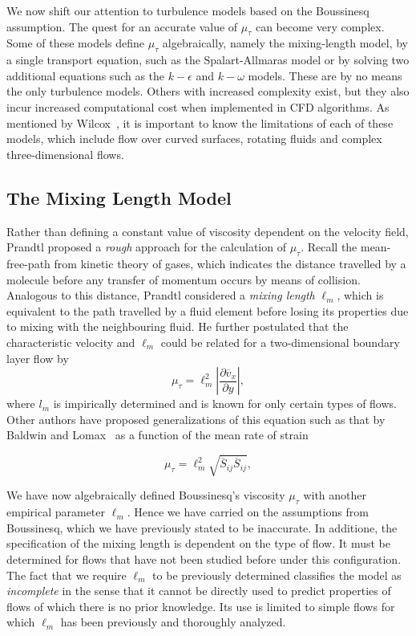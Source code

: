 We now shift our attention to turbulence models based on the Boussinesq assumption. The quest for an accurate value of $\mu_\tau$ can become very complex. Some of these models define $\mu_\tau$ algebraically, namely the mixing-length model, by a single transport equation, such as the Spalart-Allmaras model or by solving two additional equations such as the $k-\epsilon$ and $k-\omega$ models. These are by no means the only turbulence models. Others with increased complexity exist, but they also incur increased computational cost when implemented in CFD algorithms. As mentioned by Wilcox~\cite{wilcox1998turbulence}, it is important to know the limitations of each of these models, which include flow over curved surfaces, rotating fluids and complex three-dimensional flows. 

\subsection{The Mixing Length Model}
Rather than defining a constant value of viscosity dependent on the velocity field, Prandtl proposed a \textit{rough} approach for the calculation of $\mu_\tau$. Recall the mean-free-path from kinetic theory of gases, which indicates the distance travelled by a molecule before any transfer of momentum occurs by means of collision. Analogous to this distance, Prandtl considered a \textit{mixing length} $\ell_m$, which is equivalent to the path travelled by a fluid element before losing its properties due to mixing with the neighbouring fluid. He further postulated that the characteristic velocity and $\ell_m$ could be related for a two-dimensional boundary layer flow by
\begin{equation}
    \mu_\tau = \ell_m^2 \left| \frac{\partial \overline v_x}{\partial y}\right|,
\end{equation}
where $l_m$ is impirically determined and is known for only certain types of flows. Other authors have proposed generalizations of this equation such as that by Baldwin and Lomax~\cite{} as a function of the mean rate of strain~\cite{pope2001turbulent}
\begin{eqBox}
\begin{equation}
    \mu_\tau = \ell_m^2 \sqrt{\overline S_{ij} \overline S_{ij}},
\end{equation}
\end{eqBox}
We have now algebraically defined Boussinesq's viscosity $\mu_\tau$ with another empirical parameter $\ell_m$. Hence we have carried on the assumptions from Boussinesq, which we have previously stated to be inaccurate. In additione, the specification of the mixing length is dependent on the type of flow. It must be determined for flows that have not been studied before under this configuration. The fact that we require $\ell_m$ to be previously determined classifies the model as \textit{incomplete} in the sense that it cannot be directly used to predict properties of flows of which there is no prior knowledge. Its use is limited to simple flows for which $\ell_m$ has been previously and thoroughly analyzed.  
